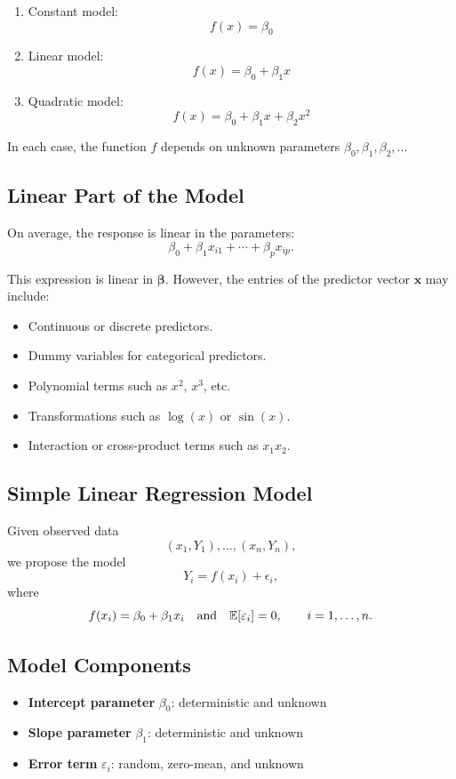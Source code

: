 \begin{enumerate}
    \item Constant model:
    \[
    f(x) = \beta_0
    \]
    \item Linear model:
    \[
    f(x) = \beta_0 + \beta_1 x
    \]
    \item Quadratic model:
    \[
    f(x) = \beta_0 + \beta_1 x + \beta_2 x^2
    \]
\end{enumerate}

In each case, the function $f$ depends on unknown parameters $\beta_0, \beta_1, \beta_2, \ldots$

\subsection{Linear Part of the Model}

On average, the response is linear in the parameters:
\[
\beta_0 + \beta_1 x_{i1} + \cdots + \beta_p x_{ip}.
\]

This expression is linear in $\boldsymbol{\beta}$. However, the entries of the predictor vector $\mathbf{x}$ may include:
\begin{itemize}
    \item Continuous or discrete predictors.
    \item Dummy variables for categorical predictors.
    \item Polynomial terms such as $x^2$, $x^3$, etc.
    \item Transformations such as $\log(x)$ or $\sin(x)$.
    \item Interaction or cross-product terms such as $x_1 x_2$.
\end{itemize}

\subsection{Simple Linear Regression Model}

Given observed data
\[
(x_1, Y_1), \dots, (x_n, Y_n),
\]
we propose the model
\[
Y_i = f(x_i) + \epsilon_i,
\]
where
\[
f(x_i) = \beta_0 + \beta_1 x_i
\quad \text{and} \quad
\mathbb{E}[\varepsilon_i] = 0, \qquad i = 1, \dots, n.
\]

\subsection{Model Components}

\begin{itemize}
    \item \textbf{Intercept parameter} $\beta_0$: deterministic and unknown
    \item \textbf{Slope parameter} $\beta_1$: deterministic and unknown
    \item \textbf{Error term} $\varepsilon_i$: random, zero-mean, and unknown
\end{itemize}

